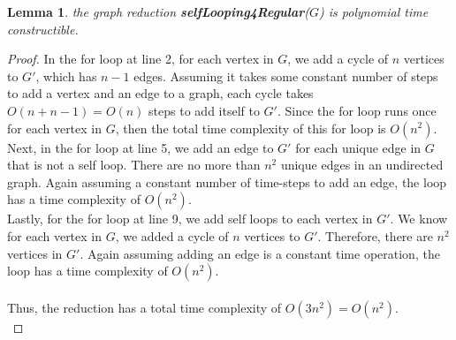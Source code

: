 \documentclass[psamsfonts, 10pt]{amsart}
\newtheorem{lem}[thm]{Lemma}
\theoremstyle{definition}
\theoremstyle{remark}
\numberwithin{equation}{section}
\begin{document}
\begin{lem} the graph reduction {\bf selfLooping4Regular}($G$) is polynomial time constructible.
\end{lem}
\begin{proof}
In the for loop at line 2, for each vertex in $G$, we add a cycle of $n$ vertices to $G'$, which has $n-1$ edges. Assuming it takes some constant number of steps to add a vertex and an edge to a graph, each cycle takes $O(n + n-1) = O(n)$ steps to add itself to $G'$. Since the for loop runs once for each vertex in $G$, then the total time complexity of this for loop is $O(n^2)$.\\

Next, in the for loop at line 5, we add an edge to $G'$ for each unique edge in $G$ that is not a self loop. There are no more than $n^2$ unique edges in an undirected graph. Again assuming a constant number of time-steps to add an edge, the loop has a time complexity of $O(n^2)$.\\

Lastly, for the for loop at line 9, we add self loops to each vertex in $G'$. We know for each vertex in $G$, we added a cycle of $n$ vertices to $G'$. Therefore, there are $n^2$ vertices in $G'$. Again assuming adding an edge is a constant time operation, the loop has a time complexity of $O(n^2)$.\\
\\
Thus, the reduction has a total time complexity of $O(3n^2) = O(n^2)$.
\\
\end{proof}
\end{document}
